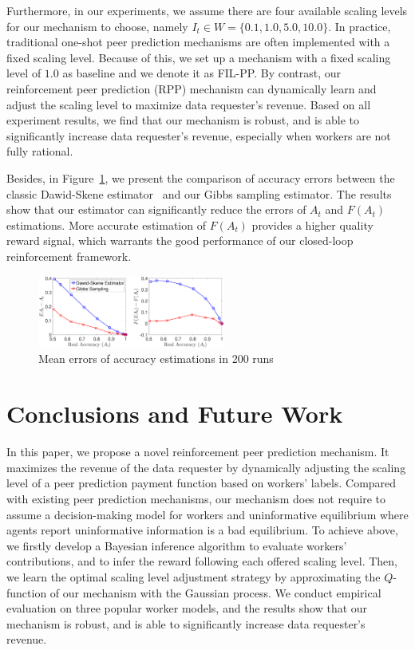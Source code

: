 \documentclass[letterpaper]{article} %
\begin{document}
Furthermore, in our experiments, we assume there are four available scaling levels for our mechanism to choose, namely $I_t \in W=\{0.1, 1.0, 5.0, 10.0\}$.
In practice, traditional one-shot peer prediction mechanisms are often implemented with a fixed scaling level. Because of this, we set up a mechanism with a fixed scaling level of $1.0$ as baseline and we denote it as FIL-PP.
By contrast, our reinforcement peer prediction (RPP) mechanism can dynamically learn and adjust the scaling level to maximize data requester's revenue.
Based on all experiment results, we find that our mechanism is robust, and is able to significantly increase data requester's revenue, especially when workers are not fully rational.


Besides, in Figure~\ref{ED2}, we present the comparison of accuracy errors between the classic Dawid-Skene estimator~\cite{dawid1979maximum} and our Gibbs sampling estimator.
The results show that our estimator can significantly reduce the errors of $A_t$ and $F(A_t)$ estimations.
More accurate estimation of $F(A_t)$ provides a higher quality reward signal, which warrants the good performance of our closed-loop reinforcement framework.


\begin{figure}[htb]
    \hspace{-8mm}
     \includegraphics[width=0.55\textwidth]{image/4}
    \caption{\label{ED2} Mean errors of accuracy estimations in 200 runs}
\end{figure}

\section{Conclusions and Future Work}
In this paper, we propose a novel reinforcement peer prediction mechanism.
It maximizes the revenue of the data requester by dynamically adjusting the scaling level of a peer prediction payment function based on workers' labels.
Compared with existing peer prediction mechanisms, our mechanism does not require to assume a decision-making model for workers and uninformative equilibrium where agents report uninformative information is a bad equilibrium.
To achieve above, we firstly develop a Bayesian inference algorithm to evaluate workers' contributions, and to infer the reward following each offered scaling level. 
Then, we learn the optimal scaling level adjustment strategy by approximating the $Q$-function of our mechanism with the Gaussian process.
We conduct empirical evaluation on three popular worker models, and the results show that our mechanism is robust, and is able to significantly increase data requester's revenue.
\end{document}
